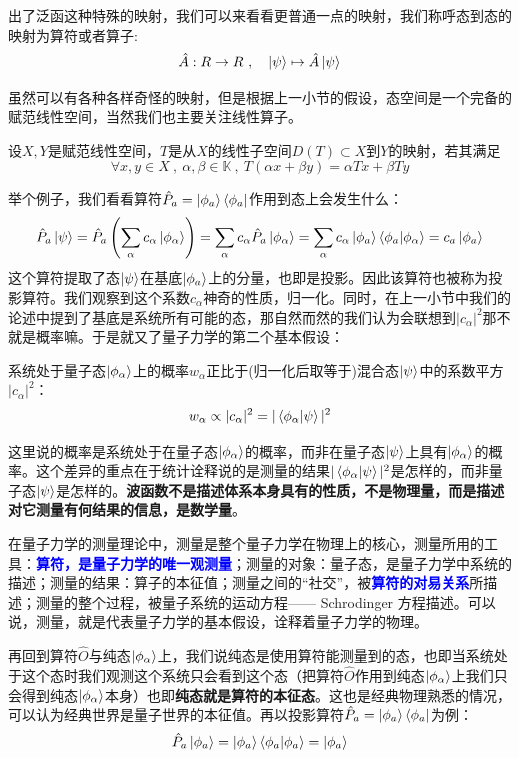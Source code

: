 出了泛函这种特殊的映射，我们可以来看看更普通一点的映射，我们称呼态到态的映射为算符或者算子:
\[\hat{A}:R \to R \ , \quad \ket{\psi} \mapsto \hat{A}\ket{\psi}\]

虽然可以有各种各样奇怪的映射，但是根据上一小节的假设，态空间是一个完备的赋范线性空间，当然我们也主要关注线性算子。
\begin{definition}[线性算子]
    设$X,Y$是赋范线性空间，$T$是从$X$的线性子空间$D(T) \subset X$到$Y$的映射，若其满足
    \[\forall x,y \in X \ , \ \alpha,\beta \in \mathbb{K} \ , \ T(\alpha x+\beta y)=\alpha Tx+\beta Ty\]
\end{definition}
举个例子，我们看看算符$\hat{P}_a=\ket{\phi_a}\bra{\phi_a}$作用到态上会发生什么：
\[\hat{P}_a\ket{\psi}=\hat{P}_a\left(\sum_{\alpha}c_{\alpha}\ket{\phi_{\alpha}}\right)=\sum_{\alpha}c_{\alpha}\hat{P}_a\ket{\phi_{\alpha}}=\sum_{\alpha}c_{\alpha}\ket{\phi_a}\bra{\phi_a}\ket{\phi_{\alpha}}=c_a\ket{\phi_a}\]
这个算符提取了态$\ket{\psi}$在基底$\ket{\phi_a}$上的分量，也即是投影。因此该算符也被称为投影算符。我们观察到这个系数$c_{\alpha}$神奇的性质，归一化。同时，在上一小节中我们的论述中提到了基底是系统所有可能的态，那自然而然的我们认为会联想到$|c_{\alpha}|^2$那不就是概率嘛。于是就又了量子力学的第二个基本假设：

\begin{theorem}[统计诠释]
系统处于量子态$\ket{\phi_{\alpha}}$上的概率$w_{\alpha}$正比于(归一化后取等于)混合态$\ket{\psi}$中的系数平方$|c_{\alpha}|^2$：
\[w_{\alpha}\propto|c_{\alpha}|^2=|\bra{\phi_{\alpha}}\ket{\psi}|^2\]
\end{theorem}

这里说的概率是系统处于在量子态$\ket{\phi_{\alpha}}$的概率，而非在量子态$\ket{\psi}$上具有$\ket{\phi_{\alpha}}$的概率。这个差异的重点在于统计诠释说的是测量的结果$|\bra{\phi_{\alpha}}\ket{\psi}|^2$是怎样的，而非量子态$\ket{\psi}$是怎样的。\textbf{波函数不是描述体系本身具有的性质，不是物理量，而是描述对它测量有何结果的信息，是数学量}。

在量子力学的测量理论中，测量是整个量子力学在物理上的核心，测量所用的工具：\textcolor{blue}{\textbf{算符，是量子力学的唯一观测量}}；测量的对象：量子态，是量子力学中系统的描述；测量的结果：算子的本征值；测量之间的“社交”，被\textcolor{blue}{\textbf{算符的对易关系}}所描述；测量的整个过程，被量子系统的运动方程—— Schrodinger 方程描述。可以说，测量，就是代表量子力学的基本假设，诠释着量子力学的物理。

再回到算符$\hat{O}$与纯态$\ket{\phi_{\alpha}}$上，我们说纯态是使用算符能测量到的态，也即当系统处于这个态时我们观测这个系统只会看到这个态（把算符$\hat{O}$作用到纯态$\ket{\phi_{\alpha}}$上我们只会得到纯态$\ket{\phi_{\alpha}}$本身）也即\textbf{纯态就是算符的本征态}。这也是经典物理熟悉的情况，可以认为经典世界是量子世界的本征值。再以投影算符$\hat{P}_a=\ket{\phi_a}\bra{\phi_a}$为例：
\[\hat{P}_a\ket{\phi_a}=\ket{\phi_a}\bra{\phi_a}\ket{\phi_a}=\ket{\phi_a}\]

